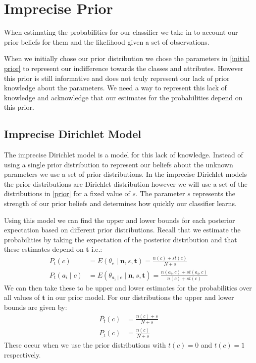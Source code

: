 \newcommand{\sn}[2]{\ensuremath{{#1}\times 10^{#2}}}

\chapter{Imprecise Prior}

When estimating the probabilities for our classifier we take in to account our prior beliefs for them and the likelihood given a set of observations.

When we initially chose our prior distribution we chose the parameters in \cref{initial prior} to represent our indifference towards the classes and attributes.
However this prior is still informative and does not truly represent our lack of prior knowledge about the parameters.
We need a way to represent this lack of knowledge and acknowledge that our estimates for the probabilities depend on this prior.

\section{Imprecise Dirichlet Model}

The imprecise Dirichlet model is a model for this lack of knowledge.
Instead of using a single prior distribution to represent our beliefs about the unknown parameters we use a set of prior distributions.
In the imprecise Dirichlet models the prior distributions are Dirichlet distribution however we will use a set of the distributions in \cref{prior} for a fixed value of $s$.
The parameter $s$ represents the strength of our prior beliefs and determines how quickly our classifier learns.

Using this model we can find the upper and lower bounds for each posterior expectation based on different prior distributions.
Recall that we estimate the probabilities by taking the expectation of the posterior distribution and that these estimates depend on $\mathbf{t}$ i.e.:
\begin{align}
	P_t(c) & = E(\theta_c \mid \mathbf{n},s,\mathbf{t}) = \frac{n(c) + st(c)}{N + s} \\
	P_t(a_i \mid c) & = E(\theta_{a_i \mid c} \mid \mathbf{n},s,\mathbf{t}) = \frac{n(a_i, c) + st(a_i, c)}{n(c) + st(c)}
\end{align}
We can then take these to be upper and lower estimates for the probabilities over all values of $\mathbf{t}$ in our prior model.
For our distributions the upper and lower bounds are given by:
\begin{align}
	\overline{P_t}(c) & = \frac{n(c) + s}{N+s} \\
	\underline{P_t}(c) & = \frac{n(c)}{N+s}
\end{align}
These occur when we use the prior distributions with $t(c) = 0$ and $t(c) = 1$ respectively.

